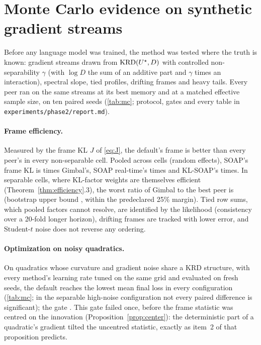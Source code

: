 \section{Monte Carlo evidence on synthetic gradient streams}
\label{sec:montecarlo}

Before any language model was trained, the method was tested where the truth is known: gradient
streams drawn from $\mathrm{KRD}(U^\star,D)$ with controlled non-separability $\gamma$ (with $\log D$ the sum of
an additive part and $\gamma$ times an interaction), spectral slope, tied profiles, drifting frames
and heavy tails. Every peer ran on the same streams at its best memory and at a matched effective
sample size, on ten paired seeds (\cref{tab:mc}; protocol, gates and every table in
\texttt{experiments/phase2/report.md}).

\paragraph{Frame efficiency.} Measured by the frame KL $J$ of \eqref{eq:J}, the default's frame is
better than every peer's in every non-separable cell. Pooled across cells (random effects), SOAP's
frame KL is \FactorSoap{} times Gimbal's, SOAP real-time's \FactorSoapRt{} times and KL-SOAP's
\FactorKlsoap{} times. In separable cells, where KL-factor weights are themselves efficient
(Theorem~\ref{thm:efficiency}.3), the worst ratio of Gimbal to the best peer is \SepWorstRatio{}
(bootstrap upper bound \SepWorstUpper{}, within the predeclared 25\% margin). Tied row sums, which
pooled factors cannot resolve, are identified by the likelihood (consistency over a 20-fold longer
horizon), drifting frames are tracked with lower error, and Student-$t$ noise does not reverse any
ordering.

\paragraph{Optimization on noisy quadratics.} On quadratics whose curvature and gradient noise
share a KRD structure, with every method's learning rate tuned on the same grid and evaluated on
fresh seeds, the default reaches the lowest mean final loss in every configuration (\cref{tab:mc};
in the separable high-noise configuration not every paired difference is significant); the gate
\GtwoFourPass. This gate failed once, before the frame statistic was centred on the innovation
(Proposition~\ref{prop:center}): the deterministic part of a quadratic's gradient tilted the
uncentred statistic, exactly as item~2 of that proposition predicts.

